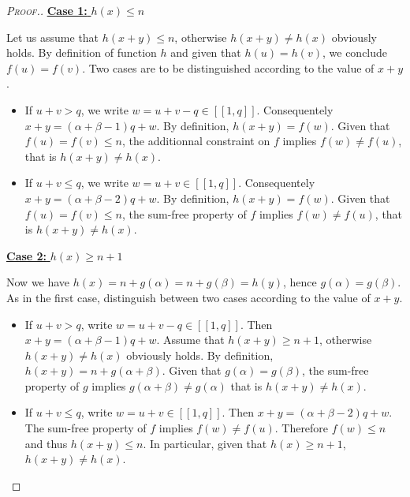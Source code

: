 \begin{proof}[\textsc{Proof.}]
	\noindent \underline{\textbf{Case 1:} \(h(x) \leqslant n\)}
	\par
	Let us assume that \(h(x+y) \leqslant n\), otherwise \(h(x + y) \neq h(x)\) obviously holds. By definition of function 
	\(h\) and given that \(h(u) = h(v)\), we conclude \(f(u) = f(v)\). Two cases are to be distinguished according to the value of \(x + y\).
	
	\begin{itemize}
	\item If \(u + v > q\), we write \(w = u + v - q \in [\![1, q]\!]\). Consequentely \(x + y = (\alpha + \beta - 1) q + w\). By definition, 
		\(h(x + y) = f(w)\). Given that \(f(u) = f(v) \leqslant n\), the additionnal constraint on \(f\) implies \(f(w) 
		\neq f(u)\), that is \(h(x + y) \neq h(x)\).
	\item If \(u + v \leqslant q\), we write \(w = u + v \in [\![1, q]\!]\). Consequentely \(x+y = (\alpha + \beta- 2) q + w\). By definition, 
		\(h(x + y) = f(w)\). Given that \(f(u) = f(v) \leqslant n\), the sum-free property of \(f\) implies \(f(w) \neq f(u)\), 
		that is \(h(x + y) \neq h(x)\).
	\end{itemize} 
	  
	\noindent \underline{\textbf{Case 2:} \(h(x) \geqslant n + 1\)}
	\par
	Now we have \(h(x) = n + g(\alpha) = 
	n + g(\beta) = h(y)\), hence \(g(\alpha) = g(\beta)\). As in the first case, distinguish between two cases according 
	to the value of \(x + y\).
	
	\begin{itemize}
	\item \begin{sloppypar}
		If \(u + v > q\), write \(w = u + v - q \in [\![1, q]\!]\). Then \(x + y = (\alpha + \beta - 1) q + w\). Assume that 
		\({h(x+y) \geqslant n + 1}\),  otherwise \(h(x + y) \neq h(x)\) obviously holds. By definition, \({h(x + y) = n + g(\alpha + 
		\beta)}\). Given that \(g(\alpha) = g(\beta)\), the sum-free property of \(g\) implies \(g(\alpha + \beta) 
		\neq g(\alpha)\) that is \(h(x + y) \neq h(x)\).
		\end{sloppypar}
	\item  If \(u + v \leqslant q\), write \(w = u + v \in [\![1, q]\!]\). Then \(x+y = (\alpha + \beta- 2) q + w\). The sum-free 
		property of \(f\) implies \(f(w) \neq f(u)\). Therefore \(f(w) \leqslant n\) and thus \(h(x + y) \leqslant n\). In particular,
		given that \(h(x) \geqslant n + 1\), \(h(x + y) \neq h(x)\).
	\end{itemize}
\end{proof}

